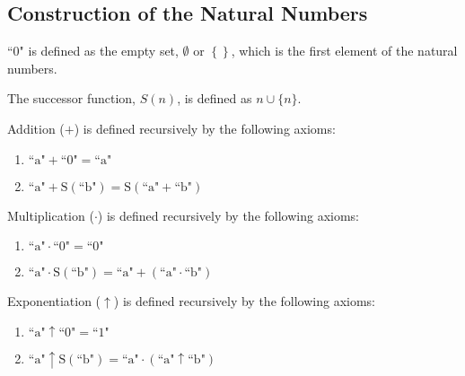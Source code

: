 \documentclass{article}
\DeclareMathOperator{\setunion}{\cup} %
\newcommand{\quo}[1]{\text{``}#1\text{"}}
\begin{document}
\subsection{Construction of the Natural Numbers}
\begin{definition}[$\quo{0}$]
    $\quo{0}$ is defined as the empty set, $\emptyset$ or $\left\{\right\}$, which is the first element of the natural numbers.
\end{definition}
%
\begin{definition}
    The successor function, $S(n)$, is defined as $n \setunion \{n\}$.
\end{definition}
%
\begin{definition}[Addition]
    Addition ($+$) is defined recursively by the following axioms:
    \begin{enumerate}[label={(A\arabic*)}, leftmargin=3.5em, itemsep=0.2em, topsep=0.35em]
        \item $\mathrm{\quo{a} + \quo{0} = \quo{a}}$
        \item $\mathrm{\quo{a} + S(\quo{b}) = S(\quo{a} + \quo{b})}$
    \end{enumerate}
\end{definition}
%
\begin{definition}[Multiplication]
    Multiplication ($\cdot$) is defined recursively by the following axioms:
    \begin{enumerate}[label={(M\arabic*)}, leftmargin=3.5em, itemsep=0.2em, topsep=0.35em]
        \item $\mathrm{\quo{a} \cdot \quo{0} = \quo{0}}$
        \item $\mathrm{\quo{a} \cdot S(\quo{b}) = \quo{a} + (\quo{a} \cdot \quo{b})}$
    \end{enumerate}
\end{definition}
%
\begin{definition}[Exponentiation]
    Exponentiation ($\uparrow$) is defined recursively by the following axioms:
    \begin{enumerate}[label={(E\arabic*)}, leftmargin=3.5em, itemsep=0.2em, topsep=0.35em]
        \item $\mathrm{\quo{a} \uparrow \quo{0} = \quo{1}}$
        \item $\mathrm{\quo{a} \uparrow S(\quo{b}) = \quo{a} \cdot (\quo{a} \uparrow \quo{b})}$
    \end{enumerate}
\end{definition}
%
\end{document}
